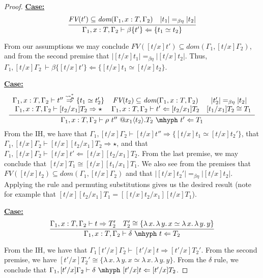 \documentclass{article}
\newcommand{\absu}[3]{{#1}\, #2.\, #3}
\newcommand{\leadstocs}[0]{\ensuremath{\leadsto_{\mathbf{n}}^*}}
\newcommand{\tpcheck}[0]{\Leftarrow}
\newcommand{\tpsynth}[0]{\Rightarrow}
\newcommand{\tpsynthleads}[0]{\ensuremath{\overset{\leadstocs}{\Rightarrow}}}
\newcommand{\startcase}[1]{\vspace{#1} \noindent\textbf{\underline{Case:}}}
\begin{document}
\begin{proof}
  \startcase{.2cm}
  \[
    \infer{\Gamma_1,x:T,\Gamma_2\vdash \beta\{t'\} \tpcheck \{ t_1 \simeq t_2 \}}
    {\textit{FV}(t')\subseteq \textit{dom}(\Gamma_1,x:T,\Gamma_2) \quad |t_1| =_{\beta\eta} |t_2|}
  \]

  From our assumptions we may conclude \(\textit{FV}([t/x]t') \subseteq
  \textit{dom}(\Gamma_1,[t/x]\Gamma_2)\), and from the second premise that
  \(|[t/x]t_1| =_{\beta\eta} |[t/x]t_2|\).
  Thus, \(\Gamma_1,[t/x]\Gamma_2\ \vdash \beta\{[t/x]t'\}\tpcheck \{[t/x]t_1
  \simeq [t/x]t_2\}\).

  \startcase{.2cm}
  \[
    \infer{\Gamma_1,x:T,\Gamma_2 \vdash \rho\ t''\ @x_1\langle t_2 \rangle.T_2\ \mhyph\ t' \tpcheck T_1}
    {
      \begin{array}{ccc}
        \Gamma_1,x:T,\Gamma_2 \vdash t'' \tpsynthleads \{t_1 \simeq t_2'\}
        & \textit{FV}(t_2) \subseteq \textit{dom}(\Gamma_1,x:T,\Gamma_2)
        & |t_2'| =_{\beta\eta} |t_2|
        \\ \Gamma_1,x:T,\Gamma_2 \vdash [t_2/x_1] T_2 \tpsynth \star
        & \Gamma_1,x:T,\Gamma_2 \vdash t' \tpcheck [t_2/x_1]T_2
        & [t_1/x_1]T_2 \cong T_1
      \end{array}
    }
  \]
  From the IH, we have that \(\Gamma_1,[t/x]\Gamma_2 \vdash [t/x]t'' \tpsynth \{[t/x]t_1
  \simeq [t/x]t_2'\}\), that \(\Gamma_1,[t/x]\Gamma_2 \vdash [t/x][t_2/x_1]T_2
  \tpsynth \star\), and that \(\Gamma_1,[t/x]\Gamma_2 \vdash [t/x]t' \tpcheck
  [t/x][t_2/x_1]T_2\).
  From the last premise, we may conclude that \([t/x]T_1 \cong
  [t/x][t_1/x_1]T_1\).
  We also see from the premises that \(\textit{FV}([t/x]t_2) \subseteq
  \textit{dom}(\Gamma_1,[t/x]\Gamma_2)\) and that \(|[t/x]t_2'| =_{\beta\eta}
  |[t/x]t_2|\).
  Applying the rule and permuting substitutions gives us the desired result
  (note for example that \([t/x][t_2/x_1]T_1 = [[t/x]t_2/x_1][t/x]T_1\)).

  \startcase{.2cm}
  \[
    \infer{\Gamma_1,x:T,\Gamma_2 \vdash \delta\ \mhyph\ t \tpcheck T_2}
    {
      \Gamma_1,x:T,\Gamma_2 \vdash t \tpsynth T_2'
      \quad T_2' \cong \{\absu{\lambda}{x}{\absu{\lambda}{y}{x}} \simeq \absu{\lambda}{x}{\absu{\lambda}{y}{y}}\}
    }
  \]

  From the IH, we have that \(\Gamma_1[t'/x]\Gamma_2 \vdash [t'/x] t \tpsynth
  [t'/x]T_2'\).
  From the second premise, we have \([t'/x]T_2' \cong
  \{\absu{\lambda}{x}{\absu{\lambda}{y}{x} \simeq
    \absu{\lambda}{x}{\absu{\lambda}{y}{y}}}\}\).
  From the \(\delta\) rule, we conclude that
  \(\Gamma_1,[t'/x]\Gamma_2 \vdash \delta\ \mhyph\ [t'/x]t \tpcheck [t'/x]T_2\).
\end{proof}
\end{document}
